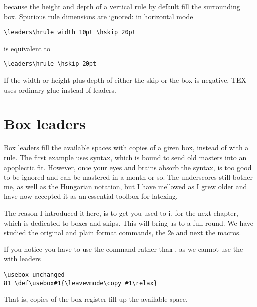 because the height and depth of a vertical rule by default fill the surrounding box.
Spurious rule dimensions are ignored: in horizontal mode

\verb+\leaders\hrule width 10pt \hskip 20pt+

is equivalent to

\verb+\leaders\hrule \hskip 20pt+

If the width or height-plus-depth of either the skip or the box is negative, TEX uses ordinary glue
instead of leaders.

\section{Box leaders}
Box leaders fill the available spaces with copies of a given box, instead of with a rule. The first example uses  syntax, which is bound to send old \tex masters into an apoplectic fit. However, once your eyes
and brains absorb the syntax,  is too good to be ignored and can be mastered in a month or so. The
underscores still bother me, as well as the Hungarian notation, but I have mellowed as I grew older and
have now accepted it as an essential toolbox for latexing.

The reason I introduced it here, is to get you used to it for the next chapter, which is dedicated to  boxes and skips. This will bring us to a full round. We have studied the original \tex and plain format commands, the \latex2e and next the  macros. 

\begin{texexample}{Box leaders}{}
\ExplSyntaxOn  
  \box_new:N \starbox
  \hbox_set:Nn \starbox 
    {
      \skip_horizontal:n { .2em  }
      \box_move_down:nn { 2.5pt }
                        {\hbox:n{*}}
      \skip_horizontal:n {.2em}
    }

  
  \hbox_to_wd:nn {\textwidth} 
    {
       \null \tex_leaders:D\box_use:N \starbox \hfill \null
    }.
\ExplSyntaxOff
\end{texexample}

If you notice you have to use the  command rather than , as we cannot use the |\leavevmode| with leaders

\begin{verbatim}
\usebox unchanged
81 \def\usebox#1{\leavevmode\copy #1\relax}
\end{verbatim}

That is, copies of the box register fill up the available space.

